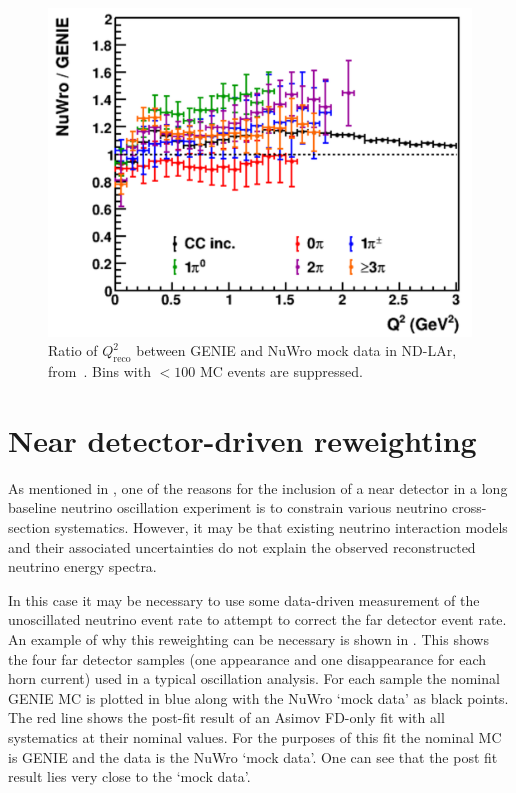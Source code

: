 \begin{figure}[h]
	\centering
	\includegraphics[width=.6\linewidth]{files/figures/dune_ndrwt/larQ2Reco}
	\caption[Ratio of $Q^{2}_{\textrm{reco}}$ between GENIE and NuWro mock data in ND-LAr.]{Ratio of $Q^{2}_{\textrm{reco}}$ between GENIE and NuWro mock data in ND-LAr, from~\cite{ndCdr}. Bins with $<100$ MC events are suppressed.}
	\label{fig:q2LarFhc}	
\end{figure}

\section{Near detector-driven reweighting}
\label{sec:dune_ndrwt:rwt}

As mentioned in , one of the reasons for the inclusion of a near detector in a long baseline neutrino oscillation experiment is to constrain various neutrino cross-section systematics.
However, it may be that existing neutrino interaction models and their associated uncertainties do not explain the observed reconstructed neutrino energy spectra.

In this case it may be necessary to use some data-driven measurement of the unoscillated neutrino event rate to attempt to correct the far detector event rate.
An example of why this reweighting can be necessary is shown in .
This shows the four far detector samples (one appearance and one disappearance for each horn current) used in a typical oscillation analysis.
For each sample the nominal GENIE MC is plotted in blue along with the NuWro `mock data' as black points.
The red line shows the post-fit result of an Asimov FD-only fit with all systematics at their nominal values. 
For the purposes of this fit the nominal MC is GENIE and the data is the NuWro `mock data'.
One can see that the post fit result lies very close to the `mock data'.
 

